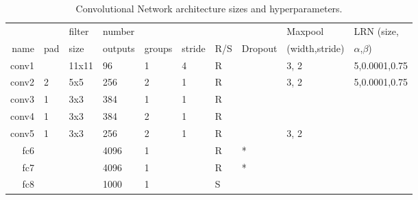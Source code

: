 \begin{table}[t]
\caption{Convolutional Network architecture sizes and hyperparameters. }
\label{tab:network_architecture}
\begin{center}
\begin{tabular}{|r|l|l|l|l|l|l|l|l|l|}
\hline
       &      & filter & number  &        &        &     &         & Maxpool        & LRN (size,        \\
name   & pad  & size   & outputs & groups & stride & R/S & Dropout & (width,stride) & $\alpha$,$\beta$) \\
\hline
conv1  &      & 11x11  & 96      & 1      & 4      & R   &         & 3, 2           & 5,0.0001,0.75     \\
conv2  & 2    & 5x5    & 256     & 2      & 1      & R   &         & 3, 2           & 5,0.0001,0.75     \\
conv3  & 1    & 3x3    & 384     & 1      & 1      & R   &         &                &                   \\
conv4  & 1    & 3x3    & 384     & 2      & 1      & R   &         &                &                   \\
conv5  & 1    & 3x3    & 256     & 2      & 1      & R   &         & 3, 2           &                   \\
fc6    &      &        & 4096    & 1      &        & R   & *       &                &                   \\
fc7    &      &        & 4096    & 1      &        & R   & *       &                &                   \\
fc8    &      &        & 1000    & 1      &        & S   &         &                &                   \\
\hline
\end{tabular}
\end{center}
\end{table}




